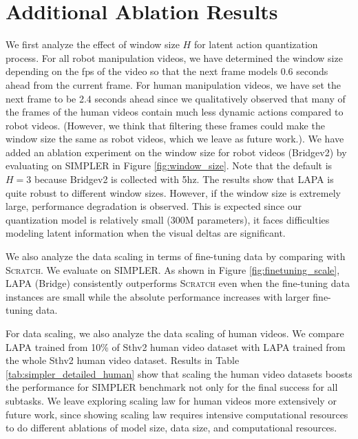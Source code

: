 \documentclass{article} %
\begin{document}
{\section{Additional Ablation Results}}
We first analyze the effect of window size $H$ for latent action quantization process. For all robot manipulation videos, we have determined the window size depending on the fps of the video so that the next frame models 0.6 seconds ahead from the current frame. For human manipulation videos, we have set the next frame to be 2.4 seconds ahead since we qualitatively observed that many of the frames of the human videos contain much less dynamic actions compared to robot videos. (However, we think that filtering these frames could make the window size the same as robot videos, which we leave as future work.). We have added an ablation experiment on the window size for robot videos (Bridgev2) by evaluating on SIMPLER in Figure \ref{fig:window_size}. Note that the default is $H=3$ because Bridgev2 is collected with 5hz.
The results show that LAPA is quite robust to different window sizes. However, if the window size is extremely large, performance degradation is observed. This is expected since our quantization model is relatively small (300M parameters), it faces difficulties modeling latent information when the visual deltas are significant. 

We also analyze the data scaling in terms of fine-tuning data by comparing with \textsc{Scratch}. We evaluate on SIMPLER. As shown in Figure \ref{fig:finetuning_scale}, LAPA (Bridge) consistently outperforms \textsc{Scratch} even when the fine-tuning data instances are small while the absolute performance increases with larger fine-tuning data.

For data scaling, we also analyze the data scaling of human videos. We compare LAPA trained from 10\% of Sthv2 human video dataset with LAPA trained from the whole Sthv2 human video dataset. Results in Table \ref{tab:simpler_detailed_human} show that scaling the human video datasets boosts the performance for SIMPLER benchmark not only for the final success for all subtasks. We leave exploring scaling law for human videos more extensively or future work, since showing scaling law requires intensive computational resources to do different ablations of model size, data size, and computational resources.
\end{document}
